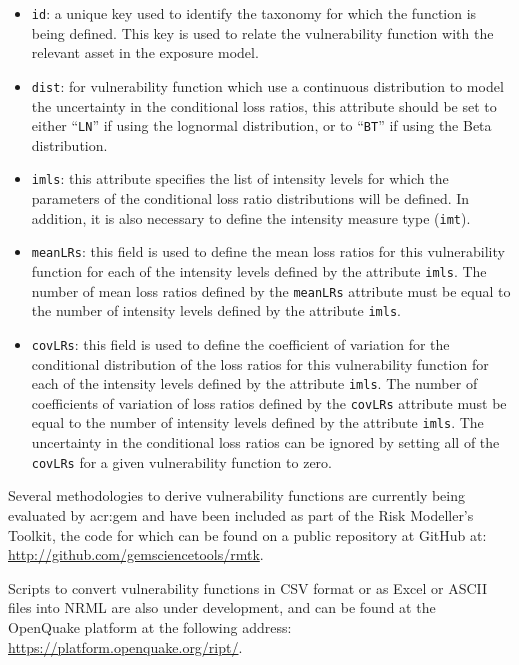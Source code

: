 \begin{itemize}

    \item \Verb+id+: a unique key used to identify the \gls{taxonomy} for 
    which the function is being defined. This key is used to relate the 
    \gls{vulnerability function} with the relevant \gls{asset} in the 
    \gls{exposure model}.

    \item \Verb+dist+: for vulnerability function which use a continuous 
    distribution to model the uncertainty in the conditional loss ratios, 
    this attribute should be set to either ``\Verb+LN+'' if using the lognormal
    distribution, or to ``\Verb+BT+'' if using the Beta distribution.

    \item \Verb+imls+: this attribute specifies the list of intensity levels
    for which the parameters of the conditional loss ratio distributions will
    be defined. In addition, it is also necessary to define the intensity 
    measure type (\Verb+imt+).

    \item \Verb+meanLRs+: this field is used to define the mean loss ratios
    for this \gls{vulnerability function} for each of the intensity levels
    defined by the attribute \Verb+imls+. The number of mean loss ratios
    defined by the \Verb+meanLRs+ attribute must be equal to the number of
    intensity levels defined by the attribute \Verb+imls+.

    \item \Verb+covLRs+: this field is used to define the coefficient of 
    variation for the conditional distribution of the loss ratios for this
    \gls{vulnerability function} for each of the intensity levels defined by
    the attribute \Verb+imls+. The number of coefficients of variation of loss
    ratios defined by the \Verb+covLRs+ attribute must be equal to the number
    of intensity levels defined by the attribute \Verb+imls+. The uncertainty
    in the conditional loss ratios can be ignored by setting all of the
    \Verb+covLRs+ for a given \gls{vulnerability function} to zero.

\end{itemize}

Several methodologies to derive \glspl{vulnerability function} are currently being
evaluated by \gls{acr:gem} and have been included as part of the Risk
Modeller's Toolkit, the code for which can be found on a public repository at
GitHub at: 
\href{http://github.com/gemsciencetools/rmtk}{http://github.com/gemsciencetools/rmtk}.

Scripts to convert \glspl{vulnerability function} in CSV format or as Excel or
ASCII files into NRML are also under development, and can be found at the
OpenQuake platform at the following address:
\href{https://platform.openquake.org/ript/}{https://platform.openquake.org/ript/}.
